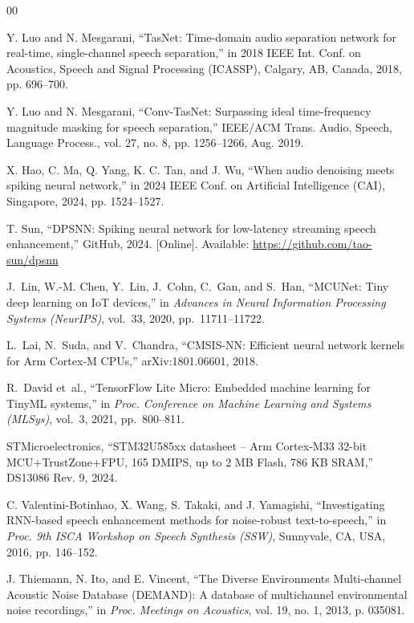 \documentclass[conference]{IEEEtran}
\begin{document}
\begin{thebibliography}{00}



 Y. Luo and N. Mesgarani, ``TasNet: Time-domain audio separation network for real-time, single-channel speech separation,'' in 2018 IEEE Int. Conf. on Acoustics, Speech and Signal Processing (ICASSP), Calgary, AB, Canada, 2018, pp. 696--700.

 Y. Luo and N. Mesgarani, ``Conv-TasNet: Surpassing ideal time-frequency magnitude masking for speech separation,'' IEEE/ACM Trans. Audio, Speech, Language Process., vol. 27, no. 8, pp. 1256--1266, Aug. 2019.

 X. Hao, C. Ma, Q. Yang, K. C. Tan, and J. Wu, ``When audio denoising meets spiking neural network,'' in 2024 IEEE Conf. on Artificial Intelligence (CAI), Singapore, 2024, pp. 1524--1527.

 T. Sun, ``DPSNN: Spiking neural network for low-latency streaming
speech enhancement,'' GitHub, 2024. [Online]. Available:
\url{https://github.com/tao-sun/dpsnn}


J.~Lin, W.-M. Chen, Y.~Lin, J.~Cohn, C.~Gan, and S.~Han,
``MCUNet: Tiny deep learning on IoT devices,''
in \emph{Advances in Neural Information Processing Systems (NeurIPS)}, vol.~33, 2020, pp.~11711--11722.

L.~Lai, N.~Suda, and V.~Chandra,
``CMSIS-NN: Efficient neural network kernels for Arm Cortex-M CPUs,''
arXiv:1801.06601, 2018.


R.~David et~al.,
``TensorFlow Lite Micro: Embedded machine learning for TinyML systems,''
in \emph{Proc. Conference on Machine Learning and Systems (MLSys)}, vol.~3, 2021, pp.~800--811.

STMicroelectronics,
``STM32U585xx datasheet -- Arm Cortex-M33 32-bit MCU+TrustZone+FPU, 165 DMIPS, up to 2 MB Flash, 786 KB SRAM,''
DS13086 Rev. 9, 2024.

C. Valentini-Botinhao, X. Wang, S. Takaki, and J. Yamagishi,
``Investigating RNN-based speech enhancement methods for noise-robust text-to-speech,''
in \emph{Proc. 9th ISCA Workshop on Speech Synthesis (SSW)}, Sunnyvale, CA, USA, 2016, pp. 146--152.

J. Thiemann, N. Ito, and E. Vincent,
``The Diverse Environments Multi-channel Acoustic Noise Database (DEMAND): A database of multichannel environmental noise recordings,''
in \emph{Proc. Meetings on Acoustics}, vol. 19, no. 1, 2013, p. 035081.


\end{thebibliography}
\end{document}
